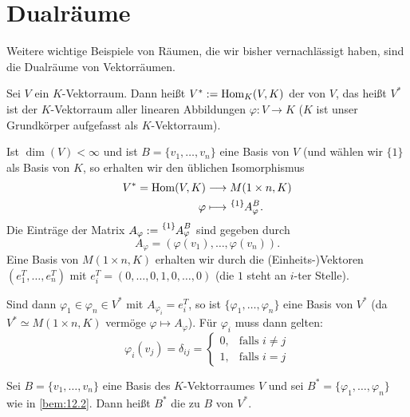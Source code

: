 \section{Dualräume}
\label{sec:2.12}
	Weitere wichtige Beispiele von Räumen, die wir bisher vernachlässigt haben, sind die Dualräume von Vektorräumen.
	
\begin{definition}[Dualraum]
	\label{def:12.1}
	Sei $V$ ein $K$-Vektorraum.
	Dann heißt $V^* := \operatorname{Hom}_K(V,K)$ der  von $V$, das heißt $V^*$ ist der $K$-Vektorraum aller linearen Abbildungen $\varphi\colon V \rightarrow K$ ($K$ ist unser Grundkörper aufgefasst als $K$-Vektorraum).
\end{definition}

\begin{bemerkung}
	\label{bem:12.2}
	Ist $\dim(V) < \infty$ und ist $B = \{v_1,\dots,v_n\}$ eine Basis von $V$ (und wählen wir $\{1\}$ als Basis von $K$, so erhalten wir den üblichen Isomorphismus
	\begin{align*}
		V^* = \Hom(V,K) &\longrightarrow M(1 \times n, K) \\
		\varphi &\longmapsto \mat{A}{\{1\}}{B}{\varphi}.
	\end{align*}
	Die Einträge der Matrix $A_\varphi := \mat{A}{\{1\}}{B}{\varphi}$ sind gegeben durch
	\[
		A_\varphi = (\varphi(v_1),\dots,\varphi(v_n)).
	\]
	Eine Basis von $M(1\times n,K)$ erhalten wir durch die (Einheits-)Vektoren $(e_1^T,\dots,e_n^T)$ mit $e_i^T = (0,\dots,0,1,0,\dots,0)$ (die $1$ steht an $i$-ter Stelle).
	
	Sind dann $\varphi_1 \in \varphi_n \in V^*$ mit $A_{\varphi_i} = e_i^T$, so ist $\{\varphi_1,\dots,\varphi_n\}$ eine Basis von $V^*$ (da $V^* \simeq M(1 \times n,K)$ vermöge $\varphi \mapsto A_\varphi$).
	Für $\varphi_i$ muss dann gelten:
	\[
		\varphi_i(v_j) = \delta_{ij} = \begin{cases}
			0, & \text{falls } i \neq j \\
			1, & \text{falls } i = j
		\end{cases}
	\]
\end{bemerkung}

\begin{definition}
	\label{def:12.3}
	Sei $B = \{v_1,\dots,v_n\}$ eine Basis des $K$-Vektorraumes $V$ und sei $B^* = \{\varphi_1,\dots,\varphi_n\}$ wie in \autoref{bem:12.2}.
	Dann heißt $B^*$ die zu $B$  von $V^*$.
\end{definition}

